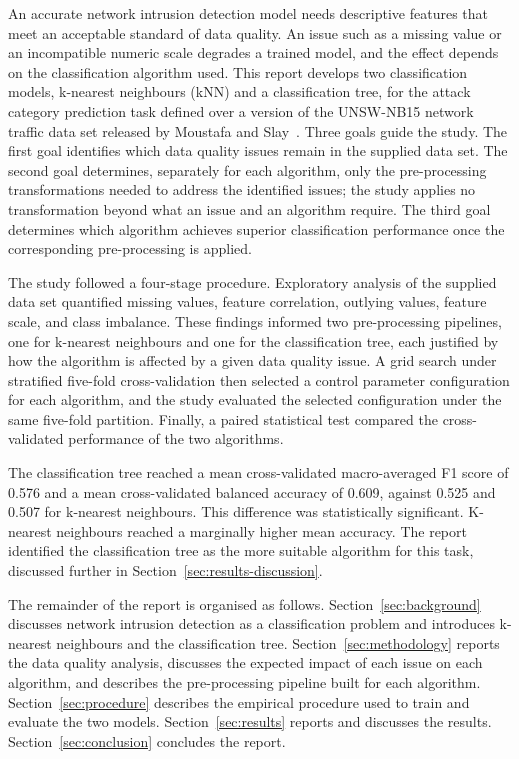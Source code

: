 \documentclass[10pt,conference]{IEEEtran}
\begin{document}
An accurate network intrusion detection model needs descriptive features that meet an acceptable standard of data quality. An issue such as a missing value or an incompatible numeric scale degrades a trained model, and the effect depends on the classification algorithm used. This report develops two classification models, k-nearest neighbours (kNN) and a classification tree, for the attack category prediction task defined over a version of the UNSW-NB15 network traffic data set released by Moustafa and Slay~\cite{moustafa2015}. Three goals guide the study. The first goal identifies which data quality issues remain in the supplied data set. The second goal determines, separately for each algorithm, only the pre-processing transformations needed to address the identified issues; the study applies no transformation beyond what an issue and an algorithm require. The third goal determines which algorithm achieves superior classification performance once the corresponding pre-processing is applied.

The study followed a four-stage procedure. Exploratory analysis of the supplied data set quantified missing values, feature correlation, outlying values, feature scale, and class imbalance. These findings informed two pre-processing pipelines, one for k-nearest neighbours and one for the classification tree, each justified by how the algorithm is affected by a given data quality issue. A grid search under stratified five-fold cross-validation then selected a control parameter configuration for each algorithm, and the study evaluated the selected configuration under the same five-fold partition. Finally, a paired statistical test compared the cross-validated performance of the two algorithms.

The classification tree reached a mean cross-validated macro-averaged F1 score of 0.576 and a mean cross-validated balanced accuracy of 0.609, against 0.525 and 0.507 for k-nearest neighbours. This difference was statistically significant. K-nearest neighbours reached a marginally higher mean accuracy. The report identified the classification tree as the more suitable algorithm for this task, discussed further in Section~\ref{sec:results-discussion}.

The remainder of the report is organised as follows. Section~\ref{sec:background} discusses network intrusion detection as a classification problem and introduces k-nearest neighbours and the classification tree. Section~\ref{sec:methodology} reports the data quality analysis, discusses the expected impact of each issue on each algorithm, and describes the pre-processing pipeline built for each algorithm. Section~\ref{sec:procedure} describes the empirical procedure used to train and evaluate the two models. Section~\ref{sec:results} reports and discusses the results. Section~\ref{sec:conclusion} concludes the report.
\end{document}
